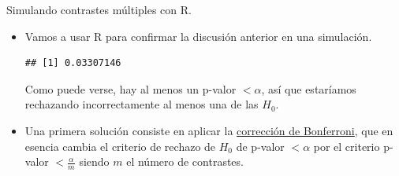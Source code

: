 \documentclass[
  9pt,
  ignorenonframetext,
]{beamer}
\newenvironment{Shaded}{\begin{snugshade}}{\end{snugshade}}
\newcommand{\CommentTok}[1]{\textcolor[rgb]{0.56,0.35,0.01}{\textit{#1}}}
\newcommand{\ControlFlowTok}[1]{\textcolor[rgb]{0.13,0.29,0.53}{\textbf{#1}}}
\newcommand{\DataTypeTok}[1]{\textcolor[rgb]{0.13,0.29,0.53}{#1}}
\newcommand{\DecValTok}[1]{\textcolor[rgb]{0.00,0.00,0.81}{#1}}
\newcommand{\KeywordTok}[1]{\textcolor[rgb]{0.13,0.29,0.53}{\textbf{#1}}}
\newcommand{\NormalTok}[1]{#1}
\newcommand{\OperatorTok}[1]{\textcolor[rgb]{0.81,0.36,0.00}{\textbf{#1}}}
\newcommand{\StringTok}[1]{\textcolor[rgb]{0.31,0.60,0.02}{#1}}
\newcommand{\link}[2]{\textcolor{blue}{{\href{#1}{#2}}}}
\begin{document}
\begin{frame}[fragile]{Simulando contrastes múltiples con R.}
\protect\hypertarget{simulando-contrastes-multiples-con-r.}{}

\begin{itemize}
\item
  Vamos a usar R para confirmar la discusión anterior en una
  simulación.\small

\begin{Shaded}
\end{Shaded}

\begin{verbatim}
## [1] 0.03307146
\end{verbatim}

  \normalsize Como puede verse, hay al menos un p-valor \(< \alpha\),
  así que estaríamos rechazando incorrectamente al menos una de las
  \(H_0\).
\item
  Una primera solución consiste en aplicar la
  \link{https://en.wikipedia.org/wiki/Bonferroni_correction}{corrección de Bonferroni},
  que en esencia cambia el criterio de rechazo de \(H_0\) de p-valor
  \(< \alpha\) por el criterio p-valor \(< \frac{\alpha}{m}\) siendo
  \(m\) el número de contrastes.
\end{itemize}

\end{frame}
\end{document}
